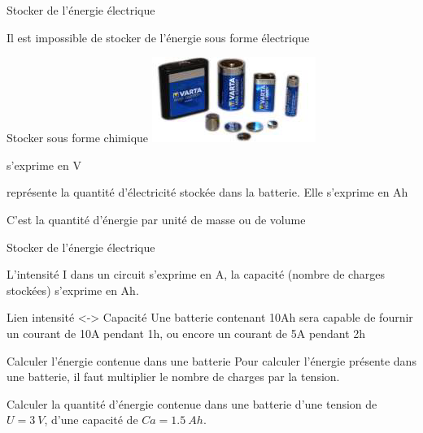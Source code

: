 \documentclass{beamer}
\begin{document}
    \begin{frame}{Stocker de l'énergie électrique}
        \begin{alertblock}{}
            Il est impossible de stocker de l'énergie sous forme électrique
        \end{alertblock}
        \begin{block}{Stocker sous forme chimique}
            \centering
            \includegraphics[height=0.2\textheight]{Cours/Premieres/ETT/Seq03_alimenter/S03C01_chaine_energie_alimenter/piles.png}            \begin{description}
                \item<1->[La tension :]{s'exprime en V}
                \item<2->[La capacité] représente la quantité d'électricité stockée dans la batterie.
                Elle s'exprime en \si{Ah}
                \item<3->[La densité énergétique] C’est la quantité d’énergie par unité de masse ou de volume
            \end{description}
        \end{block}
    \end{frame}

    \begin{frame}{Stocker de l'énergie électrique}
        \begin{alertblock}{}
            L'intensité I dans un circuit s'exprime en \si{A}, la capacité (nombre de charges stockées) s'exprime en \si{Ah}.
        \end{alertblock}
        
        \begin{block}{Lien intensité <-> Capacité}
        Une batterie contenant 10Ah sera capable de fournir un courant de 10A pendant 1h, ou encore un courant de 5A
pendant 2h
        \end{block}
    \end{frame}
    
    \begin{frame}{Calculer l'énergie contenue dans une batterie}
        Pour calculer l'énergie présente dans une batterie, il faut multiplier le nombre de charges par la tension. 
        
        \begin{block}{}
        Calculer la quantité d'énergie contenue dans une batterie d'une tension de $U = \SI{3}{V}$, d'une capacité de $Ca=\SI{1.5}{Ah}$.
        \end{block}
    \end{frame}
    
\end{document}
